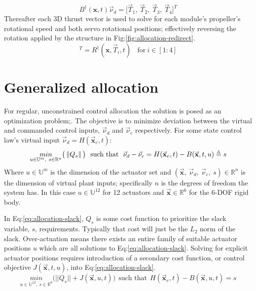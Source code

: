 \begin{equation}
B^{\dagger}(\mathbf{x},t)\vec{\nu}_d=\big[\vec{T}_1,~\vec{T}_2,~\vec{T}_3,~\vec{T}_4\big]^T
\end{equation}
Thereafter each 3D thrust vector is used to solve for each module's propeller's rotational speed and both servo rotational positions; effectively reversing the rotation applied by the structure in Fig:\ref{fig:allocation-redirect}.
\begin{equation}
[\Omega_i,~\lambda_i,~\alpha_i]^T=R^\dagger(\mathbf{x},\vec{T}_i,t)~~~~\text{for}~i\in[1:4]
\end{equation}
\section{Generalized allocation}
\label{sec:allocation.slack}
For regular, unconstrained control allocation the solution is posed as an optimization problem;\cite{allocation,controlallocation}. The objective is to minimize deviation between the virtual and commanded control inputs, $\vec{\nu}_d$ and $\vec{\nu}_c$ respectively. For some state control law's virtual input $\vec{\nu}_d=H(\vec{\mathbf{x}}_e,t)$:
\begin{equation}\label{eq:allocation-slack}
\underset{u\in\mathbb{U}^{m},~s\in\mathbb{R}^{n}}{min}\big(\left\lVert Q_s\right\rVert\big)~~\text{such that}~~\vec{\nu}_d-\vec{\nu}_c=H(\vec{\mathbf{x}}_e,t)-B(\vec{\mathbf{x}},t,u)\triangleq s
\end{equation}
Where $u\in\mathbb{U}^m$ is the dimension of the actuator set and $(\vec{\mathbf{x}},~\vec{\nu}_d,~\vec{\nu}_c,~s)\in\mathbb{R}^{n}$ is the dimension of virtual plant inputs; specifically $n$ is the degrees of freedom the system has. In this case $u\in\mathbb{U}^{12}$ for 12 actuators and $\vec{\mathbf{x}}\in\mathbb{R}^6$ for the 6-DOF rigid body.
\par
In Eq:\ref{eq:allocation-slack}, $Q_s$ is some cost function to prioritize the slack variable, $s$, requirements. Typically that cost will just be the $L_2$ norm of the slack. Over-actuation means there exists an entire family of suitable actuator positions $u$ which are all solutions to Eq:\ref{eq:allocation-slack}. Solving for explicit actuator positions requires introduction of a secondary cost function, or control objective  $J(\vec{\mathbf{x}},t,u)$, into Eq:\ref{eq:allocation-slack}.
\begin{equation}\label{eq:allocation-problem}
\underset{u\in\mathbb{U}^{12},~s\in\mathbb{R}^{6}}{min}\big(||Q_s||+J(\vec{\mathbf{x}},u,t)\big)~~\text{such that}~~H(\vec{\mathbf{x}}_e,t)-B(\vec{\mathbf{x}},u,t)=s
\end{equation}
